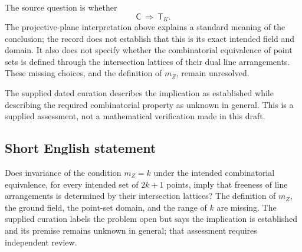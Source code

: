 \documentclass[11pt]{article}
\begin{document}
The source question is whether
\[
\mathsf C\ \Longrightarrow\ \mathsf T_K.
\]
The projective-plane interpretation above explains a standard meaning of the conclusion; the record does not establish that this is its exact intended field and domain. It also does not specify whether the combinatorial equivalence of point sets is defined through the intersection lattices of their dual line arrangements. These missing choices, and the definition of \(m_Z\), remain unresolved.

The supplied dated curation describes the implication as established while describing the required combinatorial property as unknown in general. This is a supplied assessment, not a mathematical verification made in this draft.
\subsection{Short English statement}
Does invariance of the condition \(m_Z=k\) under the intended combinatorial equivalence, for every intended set of \(2k+1\) points, imply that freeness of line arrangements is determined by their intersection lattices? The definition of \(m_Z\), the ground field, the point-set domain, and the range of \(k\) are missing. The supplied curation labels the problem open but says the implication is established and its premise remains unknown in general; that assessment requires independent review.
\end{document}
